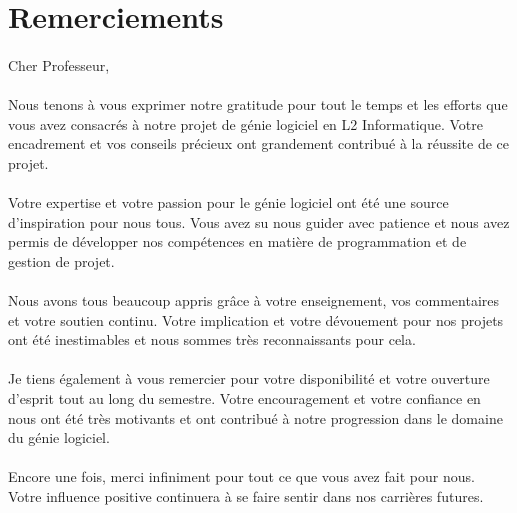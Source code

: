 \documentclass[11pt, french]{article}
\begin{document}


\tableofcontents
\listoffigures
\listoftables


\newpage
\section* {Remerciements}
\paragraph{}
Cher Professeur,
\paragraph{}
Nous tenons à vous exprimer notre gratitude pour tout le temps et les efforts que vous avez consacrés à notre projet de génie logiciel en L2 Informatique. Votre encadrement et vos conseils précieux ont grandement contribué à la réussite de ce projet.
\paragraph{}
Votre expertise et votre passion pour le génie logiciel ont été une source d'inspiration pour nous tous. Vous avez su nous guider avec patience et nous avez permis de développer nos compétences en matière de programmation et de gestion de projet.
\paragraph{}
Nous avons tous beaucoup appris grâce à votre enseignement, vos commentaires et votre soutien continu. Votre implication et votre dévouement pour nos projets ont été inestimables et nous sommes très reconnaissants pour cela.
\paragraph{}
Je tiens également à vous remercier pour votre disponibilité et votre ouverture d'esprit tout au long du semestre. Votre encouragement et votre confiance en nous ont été très motivants et ont contribué à notre progression dans le domaine du génie logiciel.
\paragraph{}
Encore une fois, merci infiniment pour tout ce que vous avez fait pour nous. Votre influence positive continuera à se faire sentir dans nos carrières futures.








\end{document}
